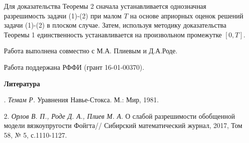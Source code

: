 Для доказательства Теоремы 2 сначала устанавливается однозначная разрешимость задачи  (1)-(2) при малом  $T$  на основе априорных оценок решений задачи  (1)-(2) в плоском случае. Затем, используя методику доказательства  Теоремы 1 единственность  устанавливается на произвольном промежутке $[0,T]$.



Работа выполнена совместно с М.А. Плиевым и Д.А.Роде.

Работа поддержана  РФФИ (грант 16-01-00370).

\smallskip \centerline{\bf Литература}. {\it Темам Р.}  Уравнения Навье-Стокса. М.: Мир,  1981.

2. {\it Орлов В. П.,  Роде Д. А., Плиев М. А.} О слабой разрешимости обобщенной
модели вязкоупругости  Фойгта// Сибирский математический журнал, 2017, Том 58, № 5, с.1110-1127.
